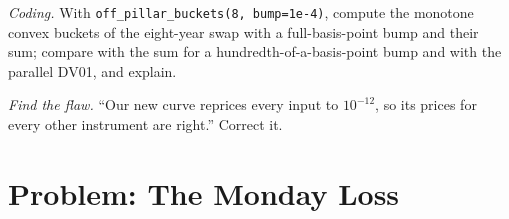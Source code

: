 \begin{exercise}[$\star\star\star$]\label{exo:rc:curve-construction:7}
\emph{Coding.} With \texttt{off\_pillar\_buckets(8, bump=1e-4)}, compute the
monotone convex buckets of the eight-year swap with a full-basis-point bump and
their sum; compare with the sum for a hundredth-of-a-basis-point bump and with
the parallel DV01, and explain.
\end{exercise}

\begin{exercise}[$\star\star\star$]\label{exo:rc:curve-construction:8}
\emph{Find the flaw.} ``Our new curve reprices every input to $10^{-12}$, so
its prices for every other instrument are right.'' Correct it.
\end{exercise}

\section{Problem: The Monday Loss}

